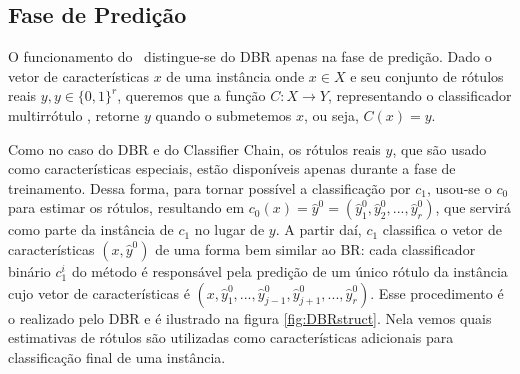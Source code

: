  \subsection{Fase de Predição}
 \label{sec:mrlm_prediction}
 O funcionamento do \MRLMa~distingue-se do DBR apenas na fase de predição.
 Dado o vetor de características $x$ de uma instância 
 onde $x\in X$ e seu conjunto de rótulos reais $y,y \in {\{0,1\}}^r$, queremos que a função $C:X\rightarrow Y$,
 representando o classificador multirrótulo \MRLMa, retorne $y$ quando o submetemos $x$, ou seja, $C(x)=y$.
 
 Como no caso do DBR e do Classifier Chain, os rótulos reais $y$, que são usado como características especiais,
 estão disponíveis apenas durante a fase de treinamento. Dessa forma, para tornar possível a classificação por $c_1$, usou-se o $c_0$ para
 estimar os rótulos, %
 resultando em $c_0(x)=\hat{y}^0=(\hat{y}_1^0,\hat{y}_2^0,...,\hat{y}_r^0)$, que servirá como parte da instância de $c_1$
 no lugar de $y$. 
A partir daí, $c_1$ classifica o vetor de características $(x,\hat{y}^0)$ de uma forma bem similar ao BR:
 cada classificador binário $c_1^i$ do método é responsável pela predição de um único rótulo da instância
 cujo vetor de características é $(x,\hat{y}_1^0,...,\hat{y}_{j-1}^0,\hat{y}_{j+1}^0,...,\hat{y}_r^0)$. 
 Esse procedimento é o realizado pelo DBR e é ilustrado na figura \ref{fig:DBRstruct}. 
 Nela vemos quais estimativas de rótulos são utilizadas como características adicionais para classificação final
 de uma instância.
 
